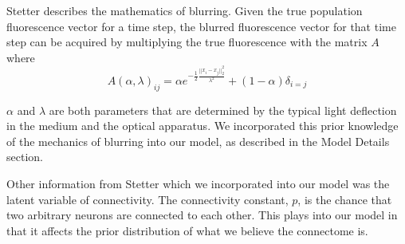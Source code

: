 \documentclass[11pt]{article}
\begin{document}
Stetter describes the mathematics of blurring. Given the true population fluorescence vector for a time step, the blurred fluorescence vector for that time step can be acquired by multiplying the true fluorescence with the matrix $A$ where \[ A(\alpha, \lambda)_{ij} =  \alpha e^{-\frac12 \frac{ || x_i - x_j ||_2^2 }{ \lambda^2 } } + (1 - \alpha) \delta_{i=j} \]

$\alpha$ and $\lambda$ are both parameters that are determined by the typical light deflection in the medium and the optical apparatus. We incorporated this prior knowledge of the mechanics of blurring into our model, as described in the Model Details section. 


Other information from Stetter which we incorporated into our model was the latent variable of  connectivity. The connectivity constant, $p$, is the chance that two arbitrary neurons are connected to each other. This plays into our model in that it affects the prior distribution of what we believe the connectome is. 
\end{document}

